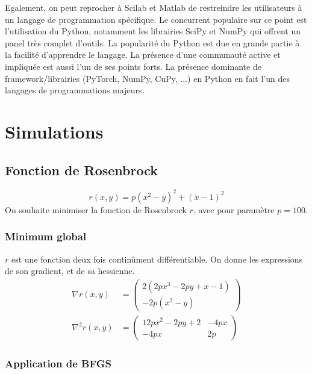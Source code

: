 \documentclass[3p, twocolumn]{elsarticle}
\begin{document}
Egalement, on peut reprocher à Scilab et Matlab de restreindre les utilisateurs à un langage de programmation spécifique. Le concurrent populaire sur ce point est l'utilisation du Python, notamment les librairies SciPy et NumPy qui offrent un panel très complet d'outils. La popularité du Python est due en grande partie à la facilité d'apprendre le langage. La présence d'une communauté active et impliquée est aussi l'un de ses points forts. La présence dominante de framework/librairies (PyTorch, NumPy, CuPy, ...) en Python en fait l'un des langages de programmations majeurs.

\section{Simulations}
\subsection{Fonction de Rosenbrock}
\begin{equation}
    r(x,y)=p(x^2-y)^2+(x-1)^2
    \label{eq:rosenbrock-function}
\end{equation}
On souhaite minimiser la fonction de Rosenbrock $r$, avec pour paramètre $p=100$.

\subsubsection{Minimum global}
    $r$ est une fonction deux fois continûment différentiable. On donne les expressions de son gradient, et de sa hessienne.
    \begin{align*}
        \nabla r(x,y) &=
        \begin{pmatrix}
            2(2px^3-2py+x-1)\\
            -2p(x^2-y)
        \end{pmatrix}\\
        \nabla ^2 r(x,y) &=
        \begin{pmatrix}
            12px^2-2py+2 & -4px\\
            -4px & 2p
        \end{pmatrix}
    \end{align*}

\subsubsection{Application de BFGS}
\end{document}
